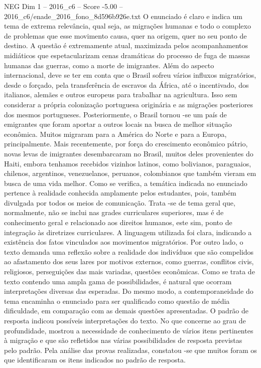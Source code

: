 \begin{textsample}{NEG Dim 1 – 2016\_c6 – Score -5.00 – 2016\_c6/enade\_2016\_fono\_8d596b926e.txt}
O enunciado é claro e indica um tema de extrema relevância, qual seja, as migrações humanas e todo o complexo de problemas que esse movimento causa, quer na origem, quer no seu ponto de destino.
A questão é extremamente atual, maximizada pelos acompanhamentos midiáticos que espetacularizam cenas dramáticas do processo de fuga de massas humanas das guerras, como a morte de imigrantes.
Além do aspecto internacional, deve se ter em conta que o Brasil sofreu vários influxos migratórios, desde o forçado, pela transferência de escravos da África, até o incentivado, dos italianos, alemães e outros europeus para trabalhar na agricultura.
Isso sem considerar a própria colonização portuguesa originária e as migrações posteriores dos mesmos portugueses.
Posteriormente, o Brasil tornou -se um país de emigrantes que foram aportar a outros locais na busca de melhor situação econômica.
Muitos migraram para a América do Norte e para a Europa, principalmente.
Mais recentemente, por força do crescimento econômico pátrio, novas levas de imigrantes desembarcaram no Brasil, muitos deles provenientes do Haiti, embora tenhamos recebidos vizinhos latinos, como bolivianos, paraguaios, chilenos, argentinos, venezuelanos, peruanos, colombianos que também vieram em busca de uma vida melhor.
Como se verifica, a temática indicada no enunciado pertence à realidade conhecida amplamente pelos estudantes, pois, também divulgada por todos os meios de comunicação.
Trata -se de tema geral que, normalmente, não se inclui nas grades curriculares superiores, mas é de conhecimento geral e relacionado aos direitos humanos, este sim, ponto de integração às diretrizes curriculares.
A linguagem utilizada foi clara, indicando a existência dos fatos vinculados aos movimentos migratórios.
Por outro lado, o texto demanda uma reflexão sobre a realidade dos indivíduos que são compelidos ao afastamento dos seus lares por motivos externos, como guerras, conflitos civis, religiosos, perseguições das mais variadas, questões econômicas.
Como se trata de texto contendo uma ampla gama de possibilidades, é natural que ocorram interpretações diversas das esperadas.
Do mesmo modo, a contemporaneidade do tema encaminha o enunciado para ser qualificado como questão de média dificuldade, em comparação com as demais questões apresentadas.
O padrão de resposta indicou possíveis interpretações do texto.
No que concerne ao grau de profundidade, mostrou a necessidade de conhecimento de vários itens pertinentes à migração e que são refletidos nas várias possibilidades de resposta previstas pelo padrão.
Pela análise das provas realizadas, constatou -se que muitos foram os que identificaram os itens indicados no padrão de resposta.

\end{textsample}
